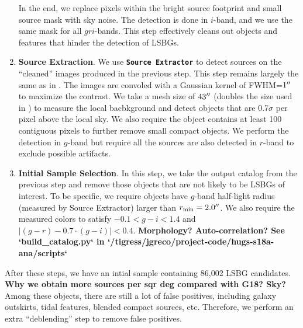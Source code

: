 \documentclass[twocolumn,astrosymb,twocolappendix]{aastex631}
\newcommand{\code}[1]{\textbf{\texttt{#1}}}
\begin{document}
\begin{CJK*}{UTF8}{gbsn}
\begin{enumerate}
    In the end, we replace pixels within the bright source footprint and small source mask with sky noise. The detection is done in $i$-band, and we use the same mask for all $gri$-bands. This step effectively cleans out objects and features that hinder the detection of LSBGs. 
    
    \item \textbf{Source Extraction}. We use \code{Source Extractor} \citep{Bertin1996} to detect sources on the ``cleaned'' images produced in the previous step. This step remains largely the same as in . The images are convoled with a Gaussian kernel of FWHM=$1\mbox{$^{\prime\prime}$}$ to maximize the contrast. We take a mesh size of $43\mbox{$^{\prime\prime}$}$ (doubles the size used in ) to measure the local bacbkground and detect objects that are 0.7$\sigma$ per pixel above the local sky. We also require the object contains at least 100 contiguous pixels to further remove small compact objects. We perform the detection in $g$-band but require all the sources are also detected in $r$-band to exclude possible artifacts. 
    
    \item \textbf{Initial Sample Selection}. In this step, we take the output catalog from the previous step and remove those objects that are not likely to be LSBGs of interest. To be specific, we require objects have $g$-band half-light radius (measured by Source Extractor) larger than $r_{\rm min} = 2.0\mbox{$^{\prime\prime}$}$. We also require the measured colors to satisfy $-0.1 < g-i < 1.4$ and $|(g-r) - 0.7\cdot (g-i)| < 0.4$. %
    \textbf{Morphology? Auto-correlation? See `build_catalog.py` in `/tigress/jgreco/project-code/hugs-s18a-ana/scripts`}
    
    
\end{enumerate}
After these steps, we have an intial sample containing 86,002 LSBG candidates. \textbf{Why we obtain more sources per sqr deg compared with G18? Sky?} Among these objects, there are still a lot of false positives, including galaxy outskirts, tidal features, blended compact sources, etc. Therefore, we perform an extra ``deblending'' step to remove false positives.  



\end{CJK*}
\end{document}
